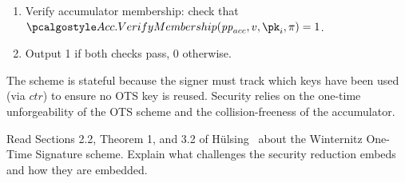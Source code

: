 \begin{mysolution}
\begin{itemize}
\begin{enumerate}
        \item Verify accumulator membership: check that $\algo{Acc.VerifyMembership}(\params_{acc}, v, \pk_i, \pi) = 1$.
        \item Output 1 if both checks pass, 0 otherwise.
      \end{enumerate}
  \end{itemize}
  The scheme is stateful because the signer must track which keys have been used (via $\mathit{ctr}$) to ensure no OTS key is reused.
  Security relies on the one-time unforgeability of the OTS scheme and the collision-freeness of the accumulator.
\end{mysolution}
\fi

\begin{exercise}[Optional]
  Read Sections 2.2, Theorem 1, and 3.2 of Hülsing~\cite{AFRICACRYPT:Hulsing13} about the Winternitz One-Time Signature scheme.
  Explain what challenges the security reduction embeds and how they are embedded.
\end{exercise}

